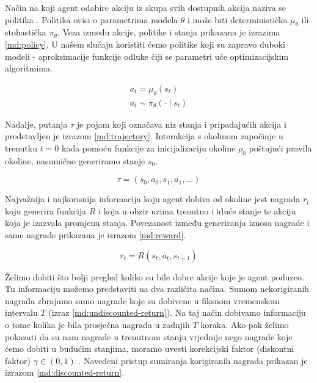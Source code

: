 Način na koji agent odabire akciju iz skupa svih dostupnih akcija naziva se politika . Politika ovisi o parametrima modela $\theta$ i može biti deterministička $\mu_{\theta}$ ili stohastička $\pi_{\theta}$. Veza između akcije, politike i stanja prikazana je izrazima \ref{md:policy}. U našem slučaju koristiti ćemo politike koji su zapravo duboki modeli - aproksimacije funkcije odluke čiji se parametri uče optimizacijskim algoritmima.  

\begin{equation}
    \begin{gathered}
    \label{md:policy}
    a_t = \mu_{\theta}(s_t) \\
    a_t \sim \pi_{\theta}(\cdot \mid s_t)
    \end{gathered}
\end{equation}

Nadalje, putanja $\tau$  je pojam koji označava niz stanja i pripadajućih akcija i predstavljen je izrazom \ref{md:trajectory}. Interakcija s okolinom započinje u trenutku $t = 0$ kada pomoću funkcije za inicijalizaciju okoline $\rho_0$ poštujući pravila okoline, nasumično generiramo stanje $s_0$.

\begin{equation}
    \label{md:trajectory}
    \tau = (s_0, a_0, s_1, a_1, ...)
\end{equation}

Najvažnija i najkorisnija informacija koju agent dobiva od okoline jest nagrada $r_t$  koju generira funkcija $R$  i koja u obzir uzima trenutno i iduće stanje te akciju koja je izazvala promjenu stanja. Povezanost između generiranja iznosa nagrade i same nagrade prikazana je izrazom \ref{md:reward}.

\begin{equation}
    \label{md:reward}
    r_t = R(s_t, a_t, s_{t+1})
\end{equation}

Želimo dobiti što bolji pregled koliko su bile dobre akcije koje je agent poduzeo. Tu informaciju možemo predstaviti na dva različita načina. Sumom nekorigiranih nagrada zbrajamo samo nagrade koje su dobivene u fiksnom vremenskom intervalu $T$ (izraz \ref{md:undiscounted-return}). Na taj način dobivamo informaciju o tome kolika je bila prosječna nagrada u zadnjih $T$ koraka. Ako pak želimo pokazati da su nam nagrade u trenutnom stanju vrjednije nego nagrade koje ćemo dobiti u budućim stanjima, moramo uvesti korekcijski faktor (diskontni faktor) $\gamma \in (0,1)$ . Navedeni pristup sumiranja korigiranih nagrada prikazan je izrazom \ref{md:discounted-return}.

